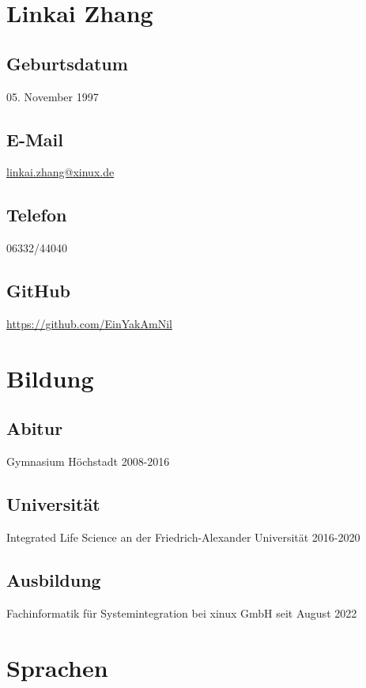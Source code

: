 \documentclass{article}
\begin{document}
\author{Linkai Zhang}

\section{Linkai Zhang}

\subsection{Geburtsdatum}
05. November 1997

\subsection{E-Mail}
\href{linkai.zhang@xinux.de}{linkai.zhang@xinux.de}

\subsection{Telefon}
06332/44040

\subsection{GitHub}
\href{https://github.com/EinYakAmNil}{https://github.com/EinYakAmNil}

\section{Bildung}

\subsection{Abitur}
Gymnasium Höchstadt 2008-2016

\subsection{Universität}
Integrated Life Science an der Friedrich-Alexander Universität 2016-2020

\subsection{Ausbildung}
Fachinformatik für Systemintegration bei xinux GmbH seit August 2022

\section{Sprachen}
\end{document}
